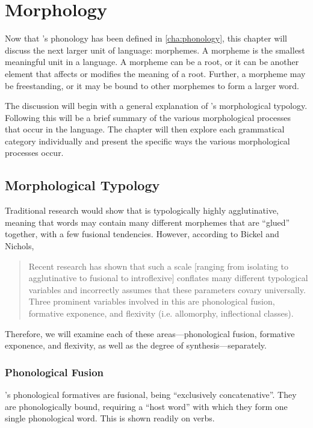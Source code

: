 \chapter{Morphology}
\label{cha:morphology}

Now that \lang{}'s phonology has been defined in \autoref{cha:phonology}, this chapter will discuss the next larger unit of language: morphemes. A morpheme is the smallest meaningful unit in a language. A morpheme can be a root, or it can be another element that affects or modifies the meaning of a root. Further, a morpheme may be freestanding, or it may be bound to other morphemes to form a larger word.

The discussion will begin with a general explanation of \lang{}'s morphological typology. Following this will be a brief summary of the various morphological processes that occur in the language. The chapter will then explore each grammatical category individually and present the specific ways the various morphological processes occur.

\section{Morphological Typology}
\label{sec:typology}

Traditional research would show that \lang{} is typologically highly agglutinative, meaning that words may contain many different morphemes that are \enquote{glued} together, with a few fusional tendencies. However, according to Bickel and Nichols, \blockquote{Recent research has shown that such a scale [ranging from isolating to agglutinative to fusional to introflexive] conflates many different typological variables and incorrectly assumes that these parameters covary universally\autocite{Plank-1999,Bickel-and-Nichols-2005}. Three prominent variables involved in this are phonological fusion, formative exponence, and flexivity (i.e. allomorphy, inflectional classes).\autocite{wals-20}} Therefore, we will examine each of these areas---phonological fusion, formative exponence, and flexivity, as well as the degree of synthesis---separately.

\subsection{Phonological Fusion}
\label{sec:fusion}

\lang{}'s phonological formatives are fusional, being \enquote{exclusively concatenative}\autocite{wals-20}. They are phonologically bound, requiring a \enquote{host word} with which they form one single phonological word. This is shown readily on verbs.

